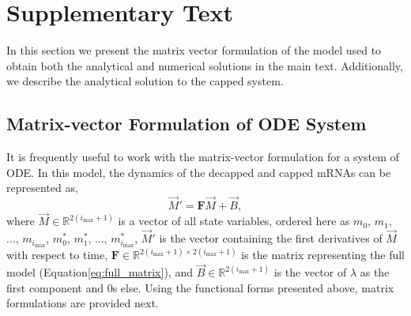 \documentclass[a4,center,fleqn,nocrop]{NAR}
\newcommand{\imax}{\ensuremath{{i_{\max}}}\xspace}
\let\bs\boldsymbol
\begin{document}
%


 


\section{Supplementary Text}

In this section we present the matrix vector formulation of the model used to obtain both the analytical and numerical solutions in the main text. Additionally, we describe the analytical solution to the capped system. 


\subsection{Matrix-vector Formulation of ODE System}
It is frequently useful to work with the matrix-vector formulation for a system of ODE.
In this model, the dynamics of the decapped and capped mRNAs can be represented as,
\begin{equation}
\vec{M}'=\boldsymbol{F}\vec{M}+\vec{B},
\end{equation} 
where $\vec{M}\in\mathbb{R}^{2(\imax+1)}$ is a vector of all state variables, ordered here as $m_0$, $m_1$, ..., $m_{\imax}$, $m^*_0$, $m^*_1$, ..., $m^*_{\imax}$, $\vec{M}'$ is the vector containing the first derivatives of $\vec{M}$ with respect to time, $\bs{F}\in\mathbb{R}^{2(\imax+1)\times 2(\imax+1)}$ is the matrix representing the full model (Equation\ref{eq:full_matrix}), and $\vec{B}\in\mathbb{R}^{2(\imax+1)}$ is the vector of $\lambda$ as the first component and 0s else.
Using the functional forms presented above, matrix formulations are provided next.
\end{document}
